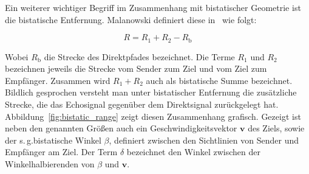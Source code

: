 Ein weiterer wichtiger Begriff im Zusammenhang mit bistatischer Geometrie ist die bistatische Entfernung. Malanowski definiert diese in~\cite[S.~10]{Malanowski2019} wie folgt:

\begin{equation}
    R = R_1 + R_2 - R_\text{b}
\end{equation}\label{eq:bistatic_range}

Wobei \(R_\text{b}\) die Strecke des Direktpfades bezeichnet. Die Terme \(R_1\) und \(R_2\) bezeichnen jeweils die Strecke vom Sender zum Ziel und vom Ziel zum Empfänger. Zusammen wird \(R_1 + R_2\) auch als bistatische Summe bezeichnet. Bildlich gesprochen versteht man unter bistatischer Entfernung die zusätzliche Strecke, die das Echosignal gegenüber dem Direktsignal zurückgelegt hat. Abbildung~\ref{fig:bistatic_range} zeigt diesen Zusammenhang grafisch. Gezeigt ist neben den genannten Größen auch ein Geschwindigkeitsvektor \(\boldsymbol{v}\) des Ziels, sowie der s.\,g.\@ bistatische Winkel \(\beta \), definiert zwischen den Sichtlinien von Sender und Empfänger am Ziel. Der Term \(\delta \) bezeichnet den Winkel zwischen der Winkelhalbierenden von \(\beta \) und \(\boldsymbol{v}\).

